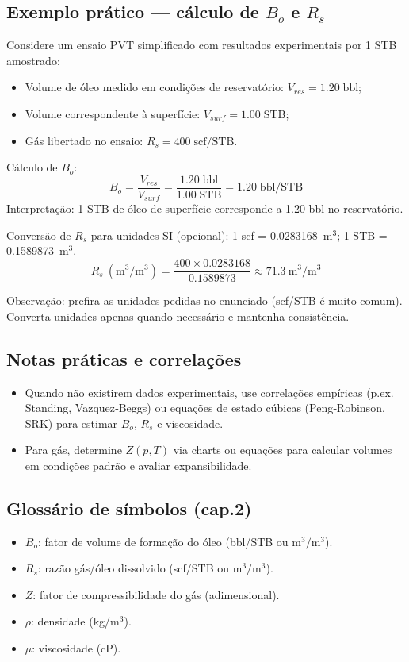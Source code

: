 \documentclass[11pt,a4paper]{article}
\begin{document}
\subsection{Exemplo prático — cálculo de $B_o$ e $R_s$}
Considere um ensaio PVT simplificado com resultados experimentais por 1 STB amostrado:
\begin{itemize}
\item Volume de óleo medido em condições de reservatório: $V_{res} = 1.20\;\text{bbl}$;
\item Volume correspondente à superfície: $V_{surf} = 1.00\;\text{STB}$;
\item Gás libertado no ensaio: $R_s = 400\;\text{scf/STB}$.
\end{itemize}

Cálculo de $B_o$:
$$
B_o = \frac{V_{res}}{V_{surf}} = \frac{1.20\;\text{bbl}}{1.00\;\text{STB}} = 1.20\;\text{bbl/STB}
$$
Interpretação: 1 STB de óleo de superfície corresponde a 1.20 bbl no reservatório.

Conversão de $R_s$ para unidades SI (opcional):
1 scf = 0.0283168~m$^3$; 1 STB = 0.1589873~m$^3$.
$$
R_s\ (\mathrm{m}^3/\mathrm{m}^3) = \frac{400\times0.0283168}{0.1589873} \approx 71.3\ \mathrm{m}^3/\mathrm{m}^3
$$

Observação: prefira as unidades pedidas no enunciado (scf/STB é muito comum). Converta unidades apenas quando necessário e mantenha consistência.

\subsection{Notas práticas e correlações}
\begin{itemize}
\item Quando não existirem dados experimentais, use correlações empíricas (p.ex. Standing, Vazquez‑Beggs) ou equações de estado cúbicas (Peng‑Robinson, SRK) para estimar $B_o$, $R_s$ e viscosidade.
\item Para gás, determine $Z(p,T)$ via charts ou equações para calcular volumes em condições padrão e avaliar expansibilidade.
\end{itemize}

\subsection{Glossário de símbolos (cap.2)}
\begin{itemize}
\item $B_o$: fator de volume de formação do óleo (bbl/STB ou $\mathrm{m}^3/\mathrm{m}^3$).
\item $R_s$: razão gás/óleo dissolvido (scf/STB ou $\mathrm{m}^3/\mathrm{m}^3$).
\item $Z$: fator de compressibilidade do gás (adimensional).
\item $\rho$: densidade (kg/$\mathrm{m}^3$).
\item $\mu$: viscosidade (cP).
\end{itemize}
\end{document}
